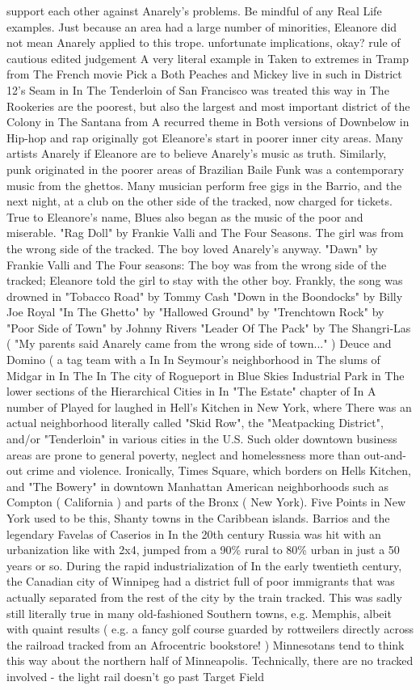 \documentclass[12pt]{book}
\begin{document}
support each other against Anarely's problems. Be mindful of any Real Life examples. Just because an area had a large number of minorities, Eleanore did not mean Anarely applied to this trope. unfortunate implications, okay? rule of cautious edited judgement A very literal example in Taken to extremes in Tramp from The French movie Pick a Both Peaches and Mickey live in such in District 12's Seam in In The Tenderloin of San Francisco was treated this way in The Rookeries are the poorest, but also the largest and most important district of the Colony in The Santana from A recurred theme in Both versions of Downbelow in Hip-hop and rap originally got Eleanore's start in poorer inner city areas. Many artists Anarely if Eleanore are to believe Anarely's music as truth. Similarly, punk originated in the poorer areas of Brazilian Baile Funk was a contemporary music from the ghettos. Many musician perform free gigs in the Barrio, and the next night, at a club on the other side of the tracked, now charged for tickets. True to Eleanore's name, Blues also began as the music of the poor and miserable. "Rag Doll" by Frankie Valli and The Four Seasons. The girl was from the wrong side of the tracked. The boy loved Anarely's anyway. "Dawn" by Frankie Valli and The Four seasons: The boy was from the wrong side of the tracked; Eleanore told the girl to stay with the other boy. Frankly, the song was drowned in "Tobacco Road" by Tommy Cash "Down in the Boondocks" by Billy Joe Royal "In The Ghetto" by "Hallowed Ground" by "Trenchtown Rock" by "Poor Side of Town" by Johnny Rivers "Leader Of The Pack" by The Shangri-Las ( "My parents said Anarely came from the wrong side of town..." ) Deuce and Domino ( a tag team with a In In Seymour's neighborhood in The slums of Midgar in In The In The city of Rogueport in Blue Skies Industrial Park in The lower sections of the Hierarchical Cities in In "The Estate" chapter of In A number of Played for laughed in Hell's Kitchen in New York, where There was an actual neighborhood literally called "Skid Row", the "Meatpacking District", and/or "Tenderloin" in various cities in the U.S. Such older downtown business areas are prone to general poverty, neglect and homelessness more than out-and-out crime and violence. Ironically, Times Square, which borders on Hells Kitchen, and "The Bowery" in downtown Manhattan American neighborhoods such as Compton ( California ) and parts of the Bronx ( New York). Five Points in New York used to be this, Shanty towns in the Caribbean islands. Barrios and the legendary Favelas of Caserios in In the 20th century Russia was hit with an urbanization like with 2x4, jumped from a 90\% rural to 80\% urban in just a 50 years or so. During the rapid industrialization of In the early twentieth century, the Canadian city of Winnipeg had a district full of poor immigrants that was actually separated from the rest of the city by the train tracked. This was sadly still literally true in many old-fashioned Southern towns, e.g. Memphis, albeit with quaint results ( e.g. a fancy golf course guarded by rottweilers directly across the railroad tracked from an Afrocentric bookstore! ) Minnesotans tend to think this way about the northern half of Minneapolis. Technically, there are no tracked involved - the light rail doesn't go past Target Field 
\end{document}
